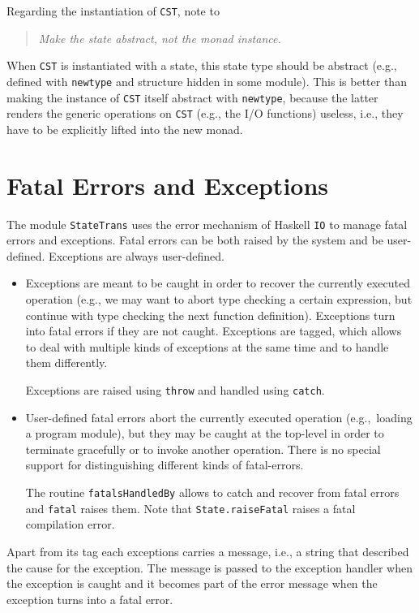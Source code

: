\documentclass{report}
\newcommand{\code}[1]{\texttt{#1}}
\begin{document}
Regarding the instantiation of \code{CST}, note to
%
\begin{quote}\itshape
  Make the state abstract, not the monad instance.
\end{quote}
%
When \code{CST} is instantiated with a state, this state type should be
abstract (e.g., defined with \code{newtype} and structure hidden in some
module).  This is better than making the instance of \code{CST} itself
abstract with \code{newtype}, because the latter renders the generic
operations on \code{CST} (e.g., the I/O functions) useless, i.e., they have to 
be explicitly lifted into the new monad.


\section{Fatal Errors and Exceptions}
\label{sec:fatal}

The module \code{StateTrans} uses the error mechanism of Haskell \code{IO} to
manage fatal errors and exceptions. Fatal errors can be both raised by the
system and be user-defined. Exceptions are always user-defined.
%
\begin{itemize}

\item Exceptions are meant to be caught in order to recover the currently
  executed operation (e.g., we may want to abort type checking a certain
  expression, but continue with type checking the next function definition).
  Exceptions turn into fatal errors if they are not caught. Exceptions are
  tagged, which allows to deal with multiple kinds of exceptions at the same
  time and to handle them differently.

  Exceptions are raised using \code{throw} and handled using \code{catch}.

\item User-defined fatal errors abort the currently executed operation (e.g.,\
  loading a program module), but they may be caught at the top-level in order
  to terminate gracefully or to invoke another operation. There is no special
  support for distinguishing different kinds of fatal-errors.

  The routine \code{fatalsHandledBy} allows to catch and recover from fatal
  errors and \code{fatal} raises them. Note that \code{State.raiseFatal} raises
  a fatal compilation error.

\end{itemize}
%
Apart from its tag each exceptions carries a message, i.e., a string that
described the cause for the exception. The message is passed to the exception
handler when the exception is caught and it becomes part of the error message
when the exception turns into a fatal error.
\end{document}
